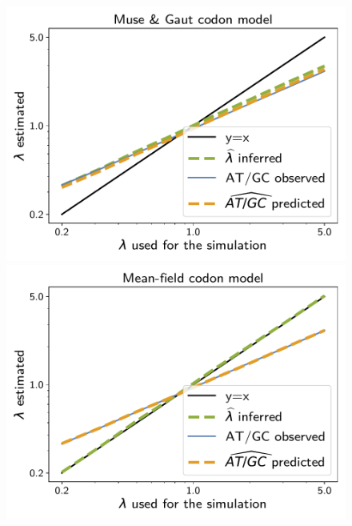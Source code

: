 \documentclass{article}
\begin{document}
\begin{figure}[!htb]
    \centering
    \begin{minipage}{0.325\linewidth}
        \includegraphics[width=\linewidth, page=1]{inference_supp_mat/PrimatesExons5Mu1.0_lambda_MG.pdf}
    \end{minipage}
    \hfill
    \begin{minipage}{0.325\linewidth}
        \includegraphics[width=\linewidth, page=1]{inference_supp_mat/PrimatesExons5Mu1.0_lambda_MF.pdf}
    \end{minipage}
    \hfill

\end{figure}
\end{document}

